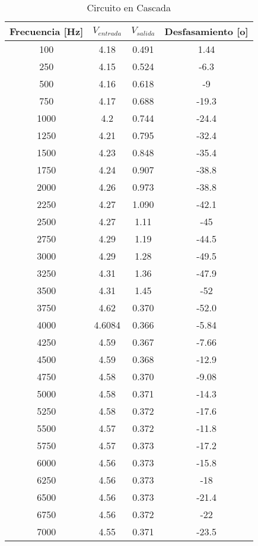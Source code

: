 \documentclass{article}
\begin{document}
\begin{table}[h!]
\centering

\begin{tabular}{|c|c|c|c|}
\hline
Frecuencia [Hz] & $V_{entrada}$ & $V_{salida}$ & Desfasamiento [o] \\ \hline
100        & 4.18          & 0.491        & 1.44         \\ \hline
250        & 4.15          & 0.524        & -6.3         \\ \hline
500        & 4.16          & 0.618        & -9           \\ \hline
750        & 4.17          & 0.688        & -19.3        \\ \hline
1000       & 4.2           & 0.744        & -24.4        \\ \hline
1250       & 4.21          & 0.795        & -32.4        \\ \hline
1500       & 4.23          & 0.848        & -35.4        \\ \hline
1750       & 4.24          & 0.907        & -38.8        \\ \hline
2000       & 4.26          & 0.973        & -38.8        \\ \hline
2250       & 4.27          & 1.090        & -42.1        \\ \hline
2500       & 4.27          & 1.11         & -45          \\ \hline
2750       & 4.29          & 1.19         & -44.5        \\ \hline
3000       & 4.29          & 1.28         & -49.5        \\ \hline
3250       & 4.31          & 1.36         & -47.9        \\ \hline
3500       & 4.31          & 1.45         & -52          \\ \hline
3750 & 4.62   & 0.370 & -52.0 \\ \hline
4000 & 4.6084 & 0.366 & -5.84 \\ \hline
4250 & 4.59   & 0.367 & -7.66 \\ \hline
4500 & 4.59   & 0.368 & -12.9 \\ \hline
4750 & 4.58   & 0.370 & -9.08 \\ \hline
5000 & 4.58   & 0.371 & -14.3 \\ \hline
5250 & 4.58   & 0.372 & -17.6 \\ \hline
5500 & 4.57   & 0.372 & -11.8 \\ \hline
5750 & 4.57   & 0.373 & -17.2 \\ \hline
6000 & 4.56   & 0.373 & -15.8 \\ \hline
6250 & 4.56   & 0.373 & -18   \\ \hline
6500 & 4.56   & 0.373 & -21.4 \\ \hline
6750 & 4.56   & 0.372 & -22   \\ \hline
7000 & 4.55   & 0.371 & -23.5 \\ \hline
\end{tabular}

\caption{Circuito en Cascada}
\label{circuitoCascada}

\end{table}
\end{document}
